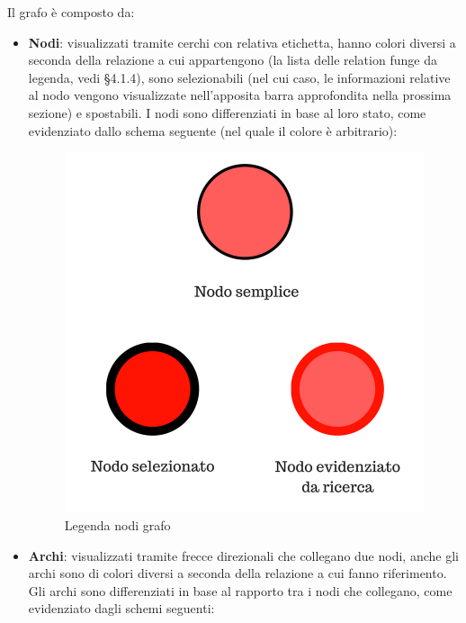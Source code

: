 \documentclass[openany,12pt,a4paper]{report}
\begin{document}
 	\newpage
 	
 	Il grafo è composto da:
 	\begin{itemize}
 		\item \textbf{Nodi}: visualizzati tramite cerchi con relativa etichetta, hanno colori diversi a seconda della relazione a cui appartengono (la lista delle relation funge da legenda, vedi §4.1.4), sono selezionabili (nel cui caso, le informazioni relative al nodo vengono visualizzate nell'apposita barra approfondita nella prossima sezione) e spostabili. I nodi sono differenziati in base al loro stato, come evidenziato dallo schema seguente (nel quale il colore è arbitrario):
 		
 		\begin{figure}[H]
 			
 			\centering
 			
 			\includegraphics[scale=0.5]{img/arrows/nodes.png}
 			
 			\caption{Legenda nodi grafo}
 			
 		\end{figure}
 	
 		\item \textbf{Archi}: visualizzati tramite frecce direzionali che collegano due nodi, anche gli archi sono di colori diversi a seconda della relazione a cui fanno riferimento. Gli archi sono differenziati in base al rapporto tra i nodi che collegano, come evidenziato dagli schemi seguenti:
 	\end{itemize}
 	
\end{document}
